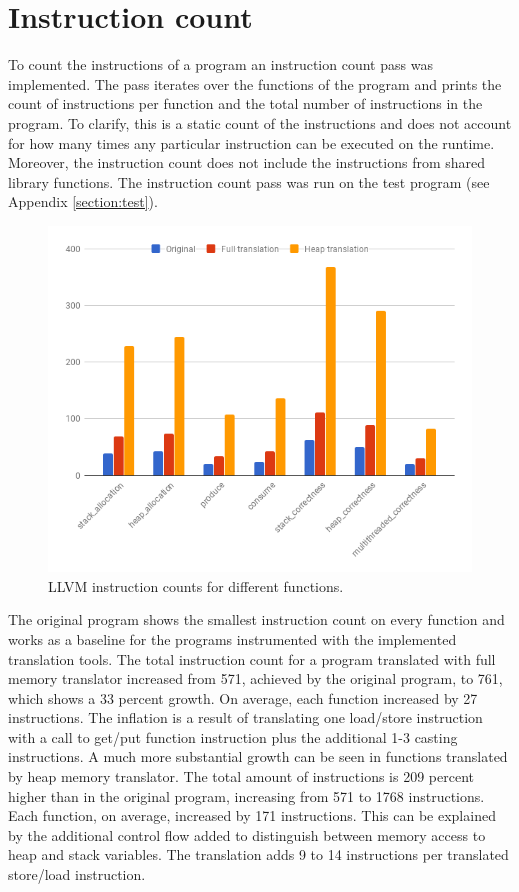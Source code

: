\documentclass[bsc,frontabs,twoside,singlespacing,parskip,deptreport]{infthesis}     %
\begin{document}
\section{Instruction count}

To count the instructions of a program an instruction count pass was implemented. The pass iterates over the functions of the program and prints the count of instructions per function and the total number of instructions in the program. To clarify, this is a static count of the instructions and does not account for how many times any particular instruction can be executed on the runtime. Moreover, the instruction count does not include the instructions from shared library functions. The instruction count pass was run on the test program (see Appendix \ref{section:test}).

\begin{figure}[H]
\centering
\includegraphics[width=1\textwidth]{images/instruction_count}
\caption{LLVM instruction counts for different functions.}
\label{fig:instruction_count}
\end{figure}

The original program shows the smallest instruction count on every function and works as a baseline for the programs instrumented with the implemented translation tools. The total instruction count for a program translated with full memory translator increased from 571, achieved by the original program, to 761, which shows a 33 percent growth. On average, each function increased by 27 instructions. The inflation is a result of translating one load/store instruction with a call to get/put function instruction plus the additional 1-3 casting instructions. A much more substantial growth can be seen in functions translated by heap memory translator. The total amount of instructions is 209 percent higher than in the original program, increasing from 571 to 1768 instructions. Each function, on average, increased by 171 instructions. This can be explained by the additional control flow added to distinguish between memory access to heap and stack variables. The translation adds 9 to 14 instructions per translated store/load instruction.
\end{document}
